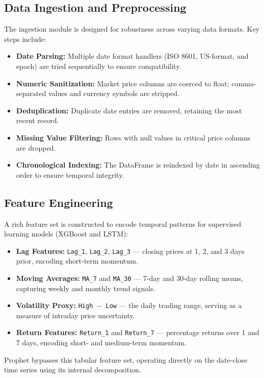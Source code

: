 \documentclass[journal,comsoc]{IEEEtran}
\begin{document}
\subsection{Data Ingestion and Preprocessing}
The ingestion module is designed for robustness across varying data formats. Key steps include:
\begin{itemize}
    \item \textbf{Date Parsing:} Multiple date format handlers (ISO 8601, US-format, and epoch) are tried sequentially to ensure compatibility.
    \item \textbf{Numeric Sanitization:} Market price columns are coerced to float; comma-separated values and currency symbols are stripped.
    \item \textbf{Deduplication:} Duplicate date entries are removed, retaining the most recent record.
    \item \textbf{Missing Value Filtering:} Rows with null values in critical price columns are dropped.
    \item \textbf{Chronological Indexing:} The DataFrame is reindexed by date in ascending order to ensure temporal integrity.
\end{itemize}

\subsection{Feature Engineering}
A rich feature set is constructed to encode temporal patterns for supervised learning models (XGBoost and LSTM):
\begin{itemize}
    \item \textbf{Lag Features:} \texttt{Lag\_1}, \texttt{Lag\_2}, \texttt{Lag\_3} — closing prices at 1, 2, and 3 days prior, encoding short-term momentum.
    \item \textbf{Moving Averages:} \texttt{MA\_7} and \texttt{MA\_30} — 7-day and 30-day rolling means, capturing weekly and monthly trend signals.
    \item \textbf{Volatility Proxy:} \texttt{High $-$ Low} — the daily trading range, serving as a measure of intraday price uncertainty.
    \item \textbf{Return Features:} \texttt{Return\_1} and \texttt{Return\_7} — percentage returns over 1 and 7 days, encoding short- and medium-term momentum.
\end{itemize}
Prophet bypasses this tabular feature set, operating directly on the date-close time series using its internal decomposition.
\end{document}
